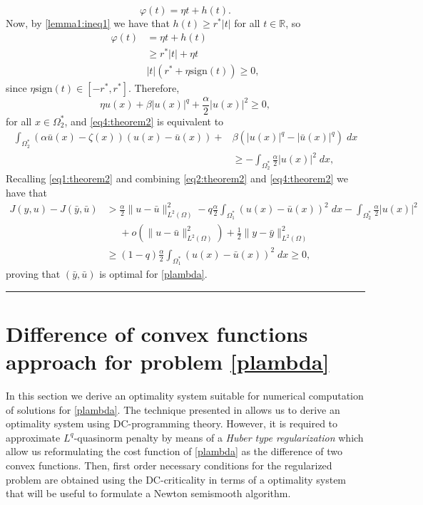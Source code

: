 \documentclass[11pt,a4paper]{amsart}
\newcommand{\kw}{\rule{2mm}{2mm}}
\newcommand{\om}{\Omega}
\newcommand{\reals}{\mathbb{R}}
\newcommand{\sign}{\mathrm{sign}}
\renewenvironment{proof}{{Proof.}}{\hfill\kw}
\newcommand{\norm}[1]{\lVert #1 \rVert}
\begin{document}
\begin{proof}
\[
\varphi(t)=\eta t+h(t).
\]
Now, by \eqref{lemma1:ineq1} we have that $h(t)\ge r^*|t|$ for all $t\in \reals$, so 
\begin{align*}
    \varphi(t)&=\eta t+h(t)\\
                &\ge r^*|t|+\eta t\\
                &|t|(r^*+\eta\sign(t))\ge 0,
\end{align*}
since $\eta\sign(t)\in [-r^*,r^*]$. Therefore, 
\[
\eta u(x)+\beta |u(x)|^q+\frac{\alpha}{2}|u(x)|^2\ge 0,
\]
for all $x\in \om_2^*$, and \eqref{eq4:theorem2} is equivalent to
\begin{equation}\label{eq5:theorem2}
\begin{split}   
\int_{\om_2^*}(\alpha\bar{u}(x)-\zeta(x))(u(x)-\bar{u}(x))+&\beta\left(|u(x)|^q-|\bar{u}(x)|^q\right)\; dx\\
&\ge-\int_{\om_2^*}\frac{\alpha}{2}|u(x)|^2\; dx,
    \end{split}
\end{equation}
Recalling \eqref{eq1:theorem2} and combining \eqref{eq2:theorem2} and \eqref{eq4:theorem2} we have that
\begin{align*}
    J(y,u)-J(\bar{y},\bar{u})&>\frac{\alpha}{2}\norm{u-\bar{u}}_{L^2(\om)}^2-q\frac{\alpha}{2}\int_{\om_1^*}(u(x)-\bar{u}(x))^2\; dx -\int_{\om_2^*}\frac{\alpha}{2}|u(x)|^2\\
    &\phantom{>}+o\left(\norm{u-\bar{u}}_{L^2(\om)}^2\right)+\frac{1}{2}\norm{y-\bar{y}}_{L^2(\om)}^2\\    
    &\ge (1-q)\frac{\alpha}{2}\int_{\om_1^*}(u(x)-\bar{u}(x))^2\; dx\ge 0,
\end{align*}
proving that $(\bar{y},\bar{u})$ is optimal for \eqref{plambda}.
\end{proof}





\section{Difference of convex functions approach for problem \eqref{plambda}}

In this section we derive an optimality system suitable for numerical computation of solutions for \eqref{plambda}. The technique presented in \cite{merino}  allows us to derive an optimality system using DC-programming theory. However,  it is required to approximate  $L^q$-quasinorm penalty by means of a \textit{Huber type regularization} which allow us reformulating the cost function of \eqref{plambda} as the difference of two convex functions. Then, first order necessary conditions for the regularized problem are obtained using the DC-criticality in terms of a optimality system that will be useful to formulate a Newton semismooth algorithm.
\end{document}
